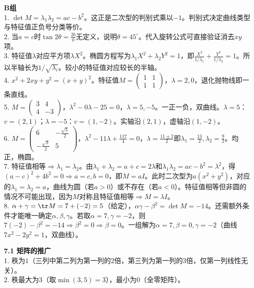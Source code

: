 \noindent\textbf{B组}\\
1. $\det M=\lambda_1\lambda_2=ac-b^2$。这正是二次型的判别式乘以$-1$。判别式决定曲线类型与特征值正负号分类等价。\\
2. 当$a=c$时$\tan2\theta=\frac{2b}{0}$无定义，说明$\theta=45^\circ$。代入旋转公式可直接验证消去$xy$项。\\
3. 特征值$\lambda$对应平方项$\lambda X^2$。椭圆方程写为$\lambda_1X^2+\lambda_2Y^2=1$，即$\frac{X^2}{1/\lambda_1}+\frac{Y^2}{1/\lambda_2}=1$。所以半轴长为$1/\sqrt{\lambda_i}$。较小的特征值对应较长的半轴。\\
4. $x^2+2xy+y^2=(x+y)^2$。特征值$M=\begin{pmatrix}1&1\\1&1\end{pmatrix}$，$\lambda=2,0$，退化抛物线即一条直线。\\
5. $M=\begin{pmatrix}3&4\\4&-3\end{pmatrix}$，$\lambda^2-0\lambda-25=0$，$\lambda=5,-5$。一正一负，双曲线。$\lambda=5$：$v=(2,1)$；$\lambda=-5$：$v=(1,-2)$。实轴沿$(2,1)$，虚轴沿$(1,-2)$。\\
6. $M=\begin{pmatrix}6&-\frac{\sqrt3}{2}\\-\frac{\sqrt3}{2}&5\end{pmatrix}$，$\lambda^2-11\lambda+\frac{117}{4}=0$，$\lambda=\frac{11\pm2}{2}$即$\lambda_1=\frac{13}{2},\lambda_2=\frac{9}{2}$。均正，椭圆。\\
7. 特征值相等$\Rightarrow\lambda_1=\lambda_2$。由$\lambda_1+\lambda_2=a+c=2\lambda$和$\lambda_1\lambda_2=ac-b^2=\lambda^2$，得$(a-c)^2+4b^2=0\Rightarrow a=c,b=0$，即$M=a I$。此时二次型为$a(x^2+y^2)$，对应的$\lambda_1=\lambda_2=a$，曲线为圆（若$a>0$）或不存在（若$a<0$）。特征值相等但非圆的情况不可能出现，因为$M$对称且特征值相等$\Rightarrow M=\lambda I$。\\
8. $\alpha+\gamma=\tr M=7+(-2)=5$（给定），$\alpha\gamma-\beta^2=\det M=-14$。还需额外条件才能唯一确定$\alpha,\beta,\gamma$。若取$\alpha=7,\gamma=-2$，则$7(-2)-\beta^2=-14\Rightarrow\beta^2=0\Rightarrow\beta=0$。一组解为$\alpha=7,\beta=0,\gamma=-2$（曲线$7x^2-2y^2=1$，双曲线）。


\noindent\textbf{7.1 矩阵的推广}\\
1. 秩为$1$（三列中第二列为第一列的$2$倍，第三列为第一列的$3$倍，仅第一列线性无关）。\\
2. 秩最大为$3$（取$\min(3,5)=3$），最小为$0$（全零矩阵）。

